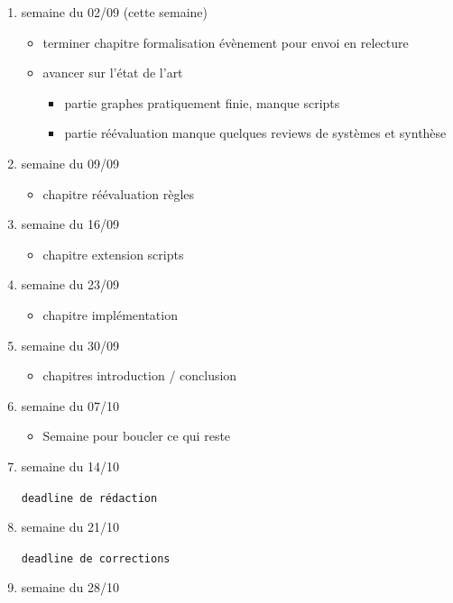 \documentclass[11pt]{article}
\begin{document}
\begin{enumerate}
\item semaine du 02/09 (cette semaine)
\label{sec:orgadb50b8}

\begin{itemize}
\item terminer chapitre formalisation évènement pour envoi en relecture
\item avancer sur l'état de l'art
\begin{itemize}
\item partie graphes pratiquement finie, manque scripts
\item partie réévaluation manque quelques reviews de systèmes et synthèse
\end{itemize}
\end{itemize}
\item semaine du 09/09
\label{sec:org1b8e6cc}

\begin{itemize}
\item chapitre réévaluation règles
\end{itemize}
\item semaine du 16/09
\label{sec:org4747422}

\begin{itemize}
\item chapitre extension scripts
\end{itemize}
\item semaine du 23/09
\label{sec:orgad7c0af}

\begin{itemize}
\item chapitre implémentation
\end{itemize}
\item semaine du 30/09
\label{sec:org7a3a01e}

\begin{itemize}
\item chapitres introduction / conclusion
\end{itemize}
\item semaine du 07/10
\label{sec:org82efe13}

\begin{itemize}
\item Semaine pour boucler ce qui reste
\end{itemize}
\item semaine du 14/10
\label{sec:org3845722}

\texttt{deadline de rédaction}
\item semaine du 21/10
\label{sec:orgcad9749}

\texttt{deadline de corrections}
\item semaine du 28/10
\label{sec:org61a0baf}
\end{enumerate}
\end{document}
